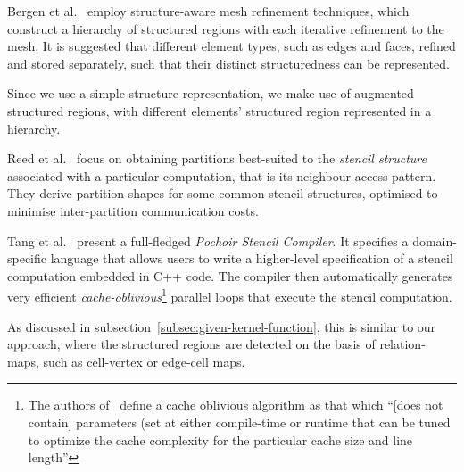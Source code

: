 
Bergen et al.~\cite{bergen2004hierarchical} employ structure-aware mesh refinement techniques, which construct a hierarchy of structured regions with each iterative refinement to the mesh. It is suggested that different element types, such as edges and faces, refined and stored separately, such that their distinct structuredness can be represented.

Since we use a simple structure representation, we make use of augmented structured regions, with different elements' structured region represented in a hierarchy.




Reed et al.~\cite{reed1987stencils} focus on obtaining partitions best-suited to the \emph{stencil structure} associated with a particular computation, that is its neighbour-access pattern. They derive partition shapes for some common stencil structures, optimised to minimise inter-partition communication costs.

Tang et al.~\cite{tang2011pochoir} present a full-fledged \emph{Pochoir Stencil Compiler}. It specifies a domain-specific language that allows users to write a higher-level specification of a stencil computation embedded in C++ code. The compiler then automatically generates very efficient \emph{cache-oblivious}\footnote{The authors of~\cite{frigo1999cache} define a cache oblivious algorithm as that which ``[does not contain] parameters (set at either compile-time or runtime that can be tuned to optimize the cache complexity for the particular cache size and line length''} parallel loops that execute the stencil computation.

As discussed in subsection~\ref{subsec:given-kernel-function}, this is similar to our approach, where the structured regions are detected on the basis of relation-maps, such as cell-vertex or edge-cell maps.



